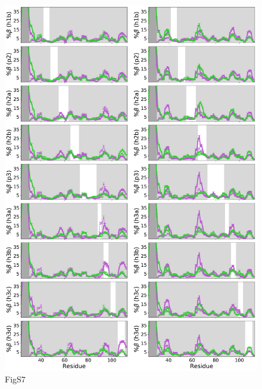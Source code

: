\documentclass[10pt,letterpaper]{article}
\begin{document}
\begin{figure}[!ht]
\includegraphics[scale=0.5,width=\textwidth,trim={0 0cm 0 0cm},clip]{./figures/S7.pdf}
\caption{{FigS7}}
\end{figure}
\end{document}

